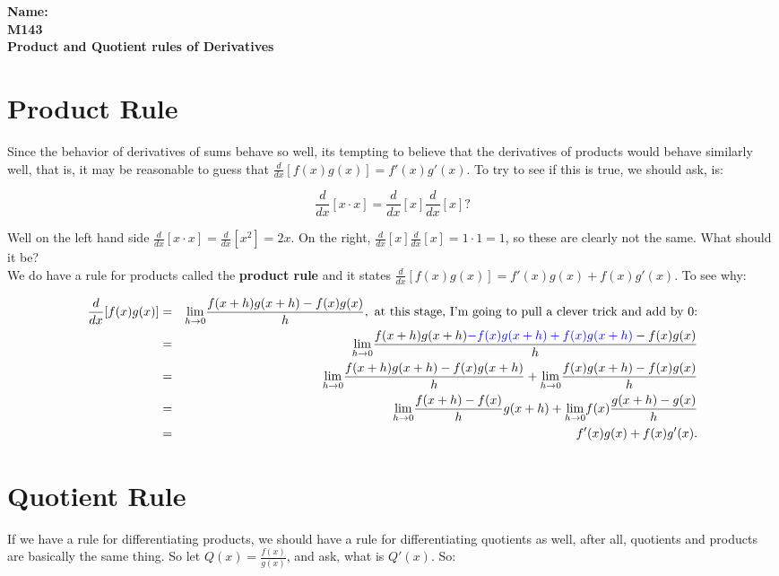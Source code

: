 \documentclass[10pt]{article}
\theoremstyle{definition}
\newcommand{\limit}[2]{\displaystyle{ \lim_{#1 \to #2}}}
\begin{document}
%

{\bf Name:} \hrulefill\hrulefill\hrulefill\\
{\bf M143} \qquad \qquad \\
{\bf Product and Quotient rules of Derivatives}\\ %

\section{Product Rule}

Since the behavior of derivatives of sums behave so well, its tempting to believe that the derivatives of products would behave similarly well, that is, it may be reasonable to guess that $\frac{d}{dx}[f(x)g(x)]=f'(x)g'(x)$.  To try to see if this is true, we should ask, is:

$$\frac{d}{dx}[x\cdot x]=\frac{d}{dx}[x]\frac{d}{dx}[x]?$$

Well on the left hand side $\frac{d}{dx}[x\cdot x]=\frac{d}{dx}[x^2]=2x$.  On the right, $\frac{d}{dx}[x]\frac{d}{dx}[x]=1\cdot1=1$, so these are clearly not the same.  What should it be?\\

We do have a rule for products called the {\bf product rule} and it states $\frac{d}{dx}[f(x)g(x)]=f'(x)g(x)+f(x)g'(x).$  To see why:

\begin{eqnarray*}
\frac{d}{dx}[f(x)g(x)]&=&\limit{h}{0}\frac{f(x+h)g(x+h)-f(x)g(x)}{h},\ \text{at this stage, I'm going to pull a clever trick and add by 0:}\\
&=&\limit{h}{0}\frac{f(x+h)g(x+h)\textcolor{blue}{-f(x)g(x+h)+f(x)g(x+h)}-f(x)g(x)}{h}\\
&=&\limit{h}{0}\frac{f(x+h)g(x+h)-f(x)g(x+h)}{h}+\limit{h}{0}\frac{f(x)g(x+h)-f(x)g(x)}{h}\\
&=&\limit{h}{0}\frac{f(x+h)-f(x)}{h}g(x+h)+\limit{h}{0}f(x)\frac{g(x+h)-g(x)}{h}\\
&=&f'(x)g(x)+f(x)g'(x).
\end{eqnarray*}



\section{Quotient Rule}

If we have a rule for differentiating products, we should have a rule for differentiating quotients as well, after all, quotients and products are basically the same thing.  So let $Q(x)=\frac{f(x)}{g(x)}$, and ask, what is $Q'(x)$.  So:
\end{document}
